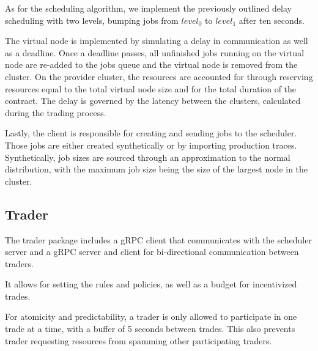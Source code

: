 As for the scheduling algorithm, we implement the previously outlined delay
scheduling with two levels, bumping jobs from $level_0$ to $level_1$ after ten
seconds.

The virtual node is implemented by simulating a delay in communication as well
as a deadline. Once a deadline passes, all unfinished jobs running on the
virtual node are re-added to the jobs queue and the virtual node is removed
from the cluster. On the provider cluster, the resources are accounted for
through reserving resources equal to the total virtual node size and for the
total duration of the contract. The delay is governed by the latency between
the clusters, calculated during the trading process.

Lastly, the client is responsible for creating and sending jobs to the
scheduler. Those jobs are either created synthetically or by importing
production traces. Synthetically, job sizes are sourced through an
approximation to the normal distribution, with the maximum job size being the
size of the largest node in the cluster.

\subsection{Trader}

The trader package includes a gRPC client that communicates with the scheduler
server and a gRPC server and client for bi-directional communication between
traders.

It allows for setting the rules and policies, as well as a budget for
incentivized trades.

For atomicity and predictability, a trader is only allowed to participate in
one trade at a time, with a buffer of 5 seconds between trades. This also
prevents trader requesting resources from spamming other participating traders. 





